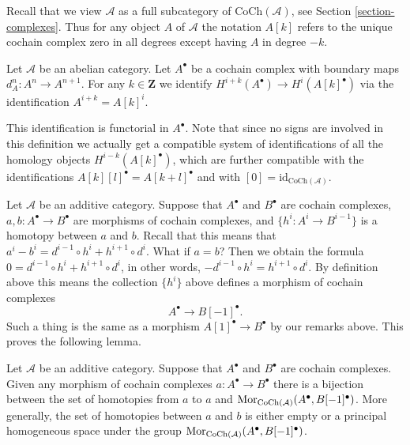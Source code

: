 \medskip\noindent
Recall that we view $\mathcal{A}$ as a full subcategory of
$\text{CoCh}(\mathcal{A})$, see Section \ref{section-complexes}.
Thus for any object $A$ of $\mathcal{A}$ the notation $A[k]$
refers to the unique cochain complex zero in all degrees except having
$A$ in degree $-k$.

\begin{definition}
\label{definition-cohomology-shift}
Let $\mathcal{A}$ be an abelian category.
Let $A^\bullet$ be a cochain complex
with boundary maps $d_A^n : A^n \to A^{n + 1}$.
For any $k \in \mathbf{Z}$ we identify
{\it $H^{i + k}(A^\bullet) \longrightarrow H^i(A[k]^\bullet)$}
via the identification $A^{i + k} = A[k]^i$.
\end{definition}

\noindent
This identification is functorial in $A^\bullet$.
Note that since no signs are involved in this
definition we actually get a compatible system
of identifications of all the homology
objects $H^{i - k}(A[k]^\bullet)$, which are
further compatible with the identifications
$A[k][l]^\bullet = A[k + l]^\bullet$ and
with $[0] = \text{id}_{\text{CoCh}(\mathcal{A})}$.

\medskip\noindent
Let $\mathcal{A}$ be an additive category.
Suppose that $A^\bullet$ and $B^\bullet$ are
cochain complexes, $a, b : A^\bullet \to B^\bullet$ are
morphisms of cochain complexes, and $\{h^i : A^i \to B^{i - 1}\}$
is a homotopy between $a$ and $b$. Recall that this means
that
$a^i - b^i = d^{i - 1} \circ h^i + h^{i + 1} \circ d^i$.
What if $a = b$? Then we obtain the formula
$0 = d^{i - 1} \circ h^i + h^{i + 1} \circ d^i$,
in other words, $ - d^{i - 1} \circ h^i = h^{i + 1} \circ d^i$.
By definition above this means the collection $\{h^i\}$
above defines a morphism of cochain complexes
$$
A^\bullet \longrightarrow B[-1]^\bullet.
$$
Such a thing is the same as a morphism $A[1]^\bullet \to B^\bullet$
by our remarks above. This proves the following lemma.

\begin{lemma}
\label{lemma-homotopy-shift-cochain}
Let $\mathcal{A}$ be an additive category.
Suppose that $A^\bullet$ and $B^\bullet$ are
cochain complexes. Given any morphism of cochain
complexes $a : A^\bullet \to B^\bullet$ there
is a bijection between the set of homotopies
from $a$ to $a$ and
$\mathop{\mathrm{Mor}}\nolimits_{\text{CoCh}(\mathcal{A})}(A^\bullet, B[-1]^\bullet)$.
More generally, the set of homotopies between
$a$ and $b$ is either empty or a principal homogeneous
space under the group
$\mathop{\mathrm{Mor}}\nolimits_{\text{CoCh}(\mathcal{A})}(A^\bullet, B[-1]^\bullet)$.
\end{lemma}


